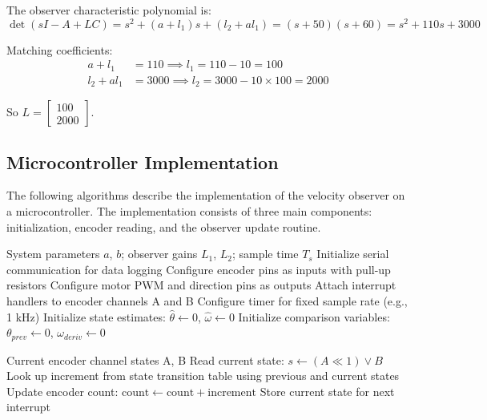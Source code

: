The observer characteristic polynomial is:
\begin{equation}
\det(sI - A + LC) = s^2 + (a + l_1)s + (l_2 + al_1) = (s+50)(s+60) = s^2 + 110s + 3000
\end{equation}

Matching coefficients:
\begin{align}
a + l_1 &= 110 \implies l_1 = 110 - 10 = 100 \\
l_2 + al_1 &= 3000 \implies l_2 = 3000 - 10 \times 100 = 2000
\end{align}

So $L = \begin{bmatrix} 100 \\ 2000 \end{bmatrix}$.

\subsection{Microcontroller Implementation}

The following algorithms describe the implementation of the velocity observer on a microcontroller. The implementation consists of three main components: initialization, encoder reading, and the observer update routine.

\begin{algorithm}
\caption{Motor Velocity Observer -- Initialization}
\begin{algorithmic}[1]
\Require System parameters $a$, $b$; observer gains $L_1$, $L_2$; sample time $T_s$
\State Initialize serial communication for data logging
\State Configure encoder pins as inputs with pull-up resistors
\State Configure motor PWM and direction pins as outputs
\State Attach interrupt handlers to encoder channels A and B
\State Configure timer for fixed sample rate (e.g., 1 kHz)
\State Initialize state estimates: $\hat{\theta} \leftarrow 0$, $\hat{\omega} \leftarrow 0$
\State Initialize comparison variables: $\theta_{prev} \leftarrow 0$, $\omega_{deriv} \leftarrow 0$
\end{algorithmic}
\end{algorithm}

\begin{algorithm}
\caption{Quadrature Encoder Interrupt Service Routine}
\begin{algorithmic}[1]
\Require Current encoder channel states A, B
\State Read current state: $s \leftarrow (A \ll 1) \lor B$
\State Look up increment from state transition table using previous and current states
\State Update encoder count: $\text{count} \leftarrow \text{count} + \text{increment}$
\State Store current state for next interrupt
\end{algorithmic}
\end{algorithm}

